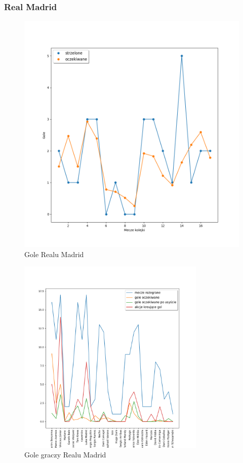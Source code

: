 \documentclass[12pt, letterpaper]{article}
\begin{document}
\subsubsection{Real Madrid}
\begin{figure}[ht]
    \centering
    \includegraphics[width=.8\textwidth]{images/UCL_Real_goals.png}
    \caption{Gole Realu Madrid}
    \label{fig:enter-label}
\end{figure}
\pagebreak
\begin{figure}[ht]
    \centering
    \includegraphics[width=0.8\textwidth]{images/UCL_Real_player_goals.png}
    \caption{Gole graczy Realu Madrid}
    \label{fig:enter-label}
\end{figure}
\end{document}
